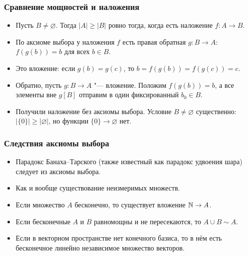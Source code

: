 \documentclass[10pt]{beamer}
\begin{document}
\begin{frame}
    \frametitle{Сравнение мощностей и наложения}
    \begin{itemize}
        \item Пусть $B\neq\varnothing$. Тогда $|A|\geq|B|$ ровно тогда, когда есть наложение $f:A\to B$.
        \item<2-> По аксиоме выбора у наложения $f$ есть правая обратная $g:B\to A$: $f(g(b))=b$ для всех $b\in B$.
        \item<3-> Это вложение: если $g(b)=g(c)$, то $b=f(g(b))=f(g(c))=c$.
        \item<4-> Обратно, пусть $g:B\to A$ "--- вложение. Положим $f(g(b))=b$, а все элементы вне $g[B]$ отправим в один фиксированный $b_0\in B$.
        \item<5-> Получили наложение без аксиомы выбора. Условие $B\neq\varnothing$ существенно: $|\{0\}|\geq|\varnothing|$, но функции $\{0\}\to\varnothing$ нет.
    \end{itemize}
\end{frame}

\begin{frame}
    \frametitle{Следствия аксиомы выбора}
    \begin{itemize}
        \item Парадокс Банаха--Тарского (также известный как парадокс удвоения шара) следует из аксиомы выбора.
        \item Как и вообще существование неизмеримых множеств.
        \item Если множество $A$ бесконечно, то существует вложение $\mathbb{N} \to A$.
        \item Если бесконечные $A$ и $B$ равномощны и не пересекаются, то $A \cup B \sim A$.
        \item Если в векторном пространстве нет конечного базиса, то в нём есть бесконечное линейно независимое множество векторов.
    \end{itemize}
\end{frame}
\end{document}
